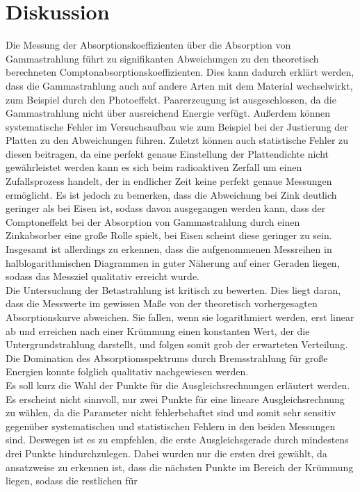 \section{Diskussion}
\label{sec:Diskussion}
Die Messung der Absorptionskoeffizienten über die Absorption von Gammastrahlung führt
zu signifikanten Abweichungen zu den theoretisch berechneten Comptonabsorptionskoeffizienten.
Dies kann dadurch erklärt werden, dass die Gammastrahlung auch auf andere Arten mit dem Material
wechselwirkt, zum Beispiel durch den Photoeffekt. Paarerzeugung ist ausgeschlossen,
da die Gammastrahlung nicht über ausreichend Energie verfügt. Außerdem können systematische
Fehler im Versuchsaufbau wie zum Beispiel bei der Justierung der Platten zu den Abweichungen führen.
Zuletzt können auch statistische Fehler zu diesen beitragen, da eine perfekt genaue Einstellung
der Plattendichte nicht gewährleistet werden kann es sich beim radioaktiven Zerfall um einen
Zufallsprozess handelt, der in endlicher Zeit keine perfekt genaue Messungen ermöglicht.
Es ist jedoch zu bemerken, dass die Abweichung bei Zink deutlich geringer als bei Eisen ist, sodass
davon ausgegangen werden kann, dass der Comptoneffekt bei der Absorption von Gammastrahlung
durch einen Zinkabsorber eine große Rolle spielt, bei Eisen scheint diese geringer zu sein.
Insgesamt ist allerdings zu erkennen, dass die aufgenommenen Messreihen in halblogarithmischen Diagrammen
in guter Näherung auf einer Geraden liegen, sodass das Messziel qualitativ erreicht wurde.\\
Die Untersuchung der Betastrahlung ist kritisch zu bewerten. Dies liegt daran, dass die Messwerte im gewissen Maße
von der theoretisch vorhergesagten Absorptionskurve abweichen. Sie fallen, wenn sie logarithmiert werden,
erst linear ab und erreichen nach einer Krümmung einen konstanten Wert, der die Untergrundstrahlung darstellt, und
folgen somit grob der erwarteten Verteilung. Die Domination des Absorptionsspektrums durch Bremsstrahlung
für große Energien konnte folglich qualitativ nachgewiesen werden. \\
Es soll kurz die Wahl der Punkte für die
Ausgleichsrechnungen erläutert werden. Es erscheint nicht sinnvoll, nur zwei Punkte für eine lineare Ausgleichsrechnung
zu wählen, da die Parameter nicht fehlerbehaftet sind und somit sehr sensitiv gegenüber systematischen und
statistischen Fehlern in den beiden Messungen sind. Deswegen ist es zu empfehlen, die erste Ausgleichsgerade
durch mindestens drei Punkte hindurchzulegen. Dabei wurden nur die ersten drei gewählt, da ansatzweise
zu erkennen ist, dass die nächsten Punkte im Bereich der Krümmung liegen, sodass die restlichen für
